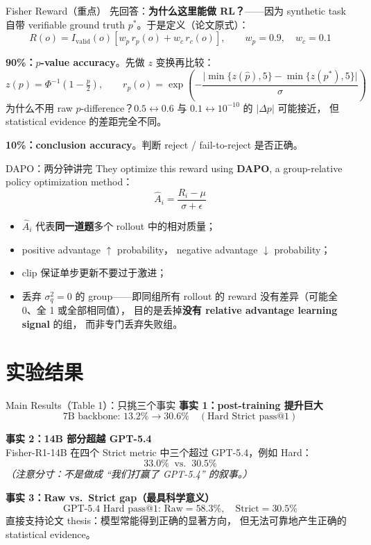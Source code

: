 \documentclass[aspectratio=169]{ctexbeamer}
\begin{document}
\begin{frame}{Fisher Reward（重点）}
  先回答：\textbf{为什么这里能做 RL？}——因为 synthetic task 自带
  verifiable ground truth $p^{*}$。于是定义（论文原式）：
  \[
    R(o) = I_{\mathrm{valid}}(o)\left[w_p\, r_p(o) + w_c\, r_c(o)\right],
    \qquad w_p = 0.9,\quad w_c = 0.1
  \]

  \medskip
  \textbf{90\%：$p$-value accuracy}。先做 $z$ 变换再比较：
  \[
    z(p) = \Phi^{-1}\!\left(1 - \tfrac{p}{2}\right),
    \qquad
    r_p(o) = \exp\!\left(
      -\frac{\bigl|\min\{z(\hat p),5\} - \min\{z(p^{*}),5\}\bigr|}{\sigma}
    \right)
  \]
  为什么不用 raw $p$-difference？$0.5\leftrightarrow 0.6$ 与
  $0.1\leftrightarrow 10^{-10}$ 的 $|\Delta p|$ 可能接近，
  但 statistical evidence 的差距完全不同。

  \medskip
  \textbf{10\%：conclusion accuracy}。判断 reject / fail-to-reject 是否正确。
\end{frame}

\begin{frame}{DAPO：两分钟讲完}
  They optimize this reward using \textbf{DAPO},
  a group-relative policy optimization method：
  \[
    \hat A_i = \frac{R_i - \mu}{\sigma + \epsilon}
  \]
  \begin{itemize}
    \item $\hat A_i$ 代表\textbf{同一道题}多个 rollout 中的相对质量；
    \item positive advantage $\uparrow$ probability，
          negative advantage $\downarrow$ probability；
    \item clip 保证单步更新不要过于激进；
    \item 丢弃 $\sigma_q^2 = 0$ 的 group——即同组所有 rollout 的 reward
          \alert{没有差异}（可能全 0、全 1 或全部相同值），
          目的是丢掉\textbf{没有 relative advantage learning signal} 的组，
          而非专门丢弃失败组。
  \end{itemize}
\end{frame}

\section{实验结果}

\begin{frame}{Main Results（Table 1）：只挑三个事实}
  \textbf{事实 1：post-training 提升巨大}
  \[
    7\text{B backbone: } 13.2\% \rightarrow 30.6\%
    \quad (\text{Hard Strict pass@1})
  \]

  \medskip
  \textbf{事实 2：14B 部分超越 GPT-5.4}\\
  Fisher-R1-14B 在四个 Strict metric 中三个超过 GPT-5.4，例如 Hard：
  \[
    33.0\% \ \text{ vs. }\ 30.5\%
  \]
  \textit{（注意分寸：不是做成 ``我们打赢了 GPT-5.4'' 的叙事。）}

  \medskip
  \textbf{事实 3：Raw vs.\ Strict gap（最具科学意义）}
  \[
    \text{GPT-5.4 Hard pass@1: } \text{Raw} = 58.3\%,\quad
    \text{Strict} = 30.5\%
  \]
  直接支持论文 thesis：模型常能得到正确的显著方向，
  但无法可靠地产生正确的 statistical evidence。
\end{frame}
\end{document}
